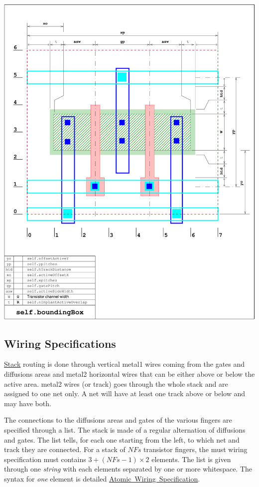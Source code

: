  
\begin{DoxyImage}
\includegraphics[width=.9\linewidth]{stack-layout-3}
\end{DoxyImage}
\hypertarget{classpython_1_1Stack_1_1Stack_secWiringSpecs}{}\subsection{Wiring Specifications}\label{classpython_1_1Stack_1_1Stack_secWiringSpecs}
\mbox{\hyperlink{classpython_1_1Stack_1_1Stack}{Stack}} routing is done through vertical {\ttfamily metal1} wires coming from the gates and diffusions areas and {\ttfamily metal2} horizontal wires that can be either above or below the active area. {\ttfamily metal2} wires (or track) goes through the whole stack and are assigned to one net only. A net will have at least one track above or below and may have both.

The connections to the diffusions areas and gates of the various fingers are specified through a list. The stack is made of a regular alternation of diffusions and gates. The list tells, for each one starting from the left, to which net and track they are connected. For a stack of $NFs$ transistor fingers, the must wiring specification must contains $ 3 + (NFs-1) \times 2$ elements. The list is given through one {\itshape string} with each elements separated by one or more whitespace. The syntax for {\itshape one} element is detailed \mbox{\hyperlink{classpython_1_1Stack_1_1Stack_secAtomicWiring}{Atomic Wiring Specification}}.

